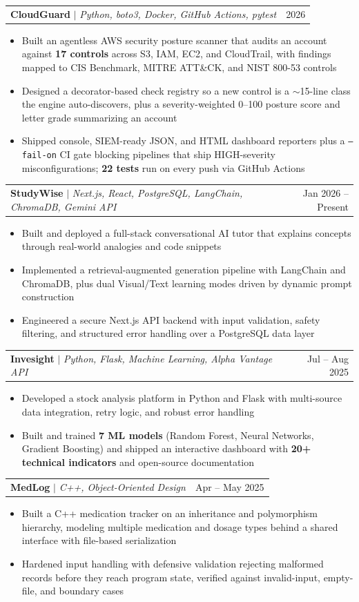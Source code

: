 \documentclass[letterpaper,11pt]{article}
\makeatletter
\newcommand{\resumeItem}[1]{
  \item\small{{#1 \vspace{-3pt}}}
}
\newcommand{\resumeProjectHeading}[2]{
    \item
    \begin{tabular*}{0.97\textwidth}{l@{\extracolsep{\fill}}r}
      \small#1 & #2 \\
    \end{tabular*}\vspace{-7pt}
}
\newcommand{\resumeItemListStart}{\begin{itemize}}
\newcommand{\resumeItemListEnd}{\end{itemize}\vspace{-6pt}}
\makeatother
\begin{document}
      \resumeProjectHeading
          {\textbf{CloudGuard} $|$ \emph{Python, boto3, Docker, GitHub Actions, pytest}}{2026}
          \resumeItemListStart
            \resumeItem{Built an agentless AWS security posture scanner that audits an account against \textbf{17 controls} across S3, IAM, EC2, and CloudTrail, with findings mapped to CIS Benchmark, MITRE ATT\&CK, and NIST 800-53 controls}
            \resumeItem{Designed a decorator-based check registry so a new control is a $\sim$15-line class the engine auto-discovers, plus a severity-weighted 0--100 posture score and letter grade summarizing an account}
            \resumeItem{Shipped console, SIEM-ready JSON, and HTML dashboard reporters plus a \texttt{--fail-on} CI gate blocking pipelines that ship HIGH-severity misconfigurations; \textbf{22 tests} run on every push via GitHub Actions}
          \resumeItemListEnd

      \resumeProjectHeading
          {\textbf{StudyWise} $|$ \emph{Next.js, React, PostgreSQL, LangChain, ChromaDB, Gemini API}}{Jan 2026 -- Present}
          \resumeItemListStart
            \resumeItem{Built and deployed a full-stack conversational AI tutor that explains concepts through real-world analogies and code snippets}
            \resumeItem{Implemented a retrieval-augmented generation pipeline with LangChain and ChromaDB, plus dual Visual/Text learning modes driven by dynamic prompt construction}
            \resumeItem{Engineered a secure Next.js API backend with input validation, safety filtering, and structured error handling over a PostgreSQL data layer}
          \resumeItemListEnd

      \resumeProjectHeading
          {\textbf{Invesight} $|$ \emph{Python, Flask, Machine Learning, Alpha Vantage API}}{Jul -- Aug 2025}
          \resumeItemListStart
            \resumeItem{Developed a stock analysis platform in Python and Flask with multi-source data integration, retry logic, and robust error handling}
            \resumeItem{Built and trained \textbf{7 ML models} (Random Forest, Neural Networks, Gradient Boosting) and shipped an interactive dashboard with \textbf{20+ technical indicators} and open-source documentation}
          \resumeItemListEnd

      \resumeProjectHeading
          {\textbf{MedLog} $|$ \emph{C++, Object-Oriented Design}}{Apr -- May 2025}
          \resumeItemListStart
            \resumeItem{Built a C++ medication tracker on an inheritance and polymorphism hierarchy, modeling multiple medication and dosage types behind a shared interface with file-based serialization}
            \resumeItem{Hardened input handling with defensive validation rejecting malformed records before they reach program state, verified against invalid-input, empty-file, and boundary cases}
          \resumeItemListEnd
\end{document}

